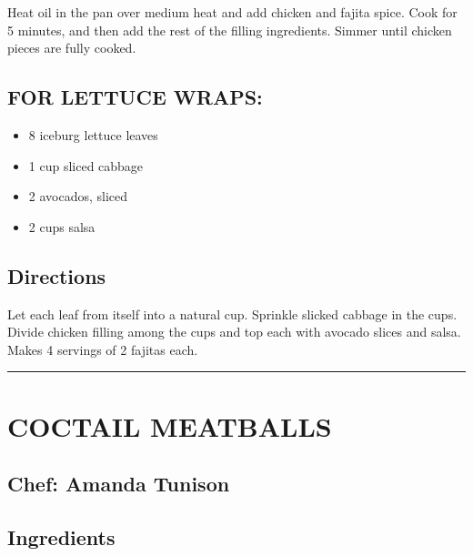 \documentclass[
]{book}
\providecommand{\tightlist}{%
  \setlength{\itemsep}{0pt}\setlength{\parskip}{0pt}}
\begin{document}
Heat oil in the pan over medium heat and add chicken and fajita spice. Cook for 5 minutes, and then
add the rest of the filling ingredients. Simmer until chicken pieces are fully cooked.

\hypertarget{for-lettuce-wraps}{%
\subsection*{FOR LETTUCE WRAPS:}\label{for-lettuce-wraps}}


\begin{itemize}
\tightlist
\item
  8 iceburg lettuce leaves
\item
  1 cup sliced cabbage
\item
  2 avocados, sliced
\item
  2 cups salsa
\end{itemize}

\hypertarget{directions-49}{%
\subsection*{Directions}\label{directions-49}}


Let each leaf from itself into a natural cup. Sprinkle slicked cabbage in the cups.
Divide chicken filling among the cups and top each with avocado slices and salsa.
Makes 4 servings of 2 fajitas each.

\begin{center}\rule{0.5\linewidth}{0.5pt}\end{center}

\hypertarget{coctail-meatballs}{%
\section*{COCTAIL MEATBALLS}\label{coctail-meatballs}}


\hypertarget{chef-amanda-tunison}{%
\subsection*{Chef: Amanda Tunison}\label{chef-amanda-tunison}}


\hypertarget{ingredients-50}{%
\subsection*{Ingredients}\label{ingredients-50}}
\end{document}
